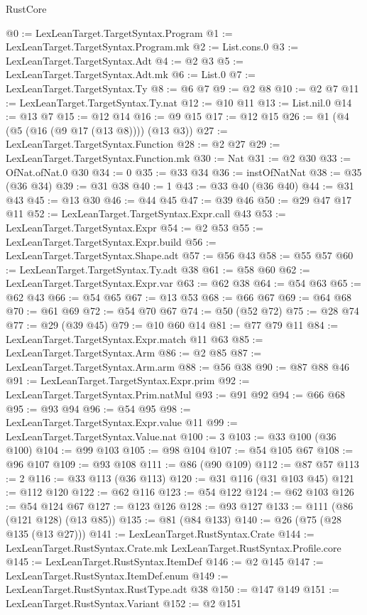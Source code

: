\begin{lexlean}{RustCore}
\begin{coremodule}
@0 := LexLeanTarget.TargetSyntax.Program
@1 := LexLeanTarget.TargetSyntax.Program.mk
@2 := List.cons.{0}
@3 := LexLeanTarget.TargetSyntax.Adt
@4 := @2 @3
@5 := LexLeanTarget.TargetSyntax.Adt.mk
@6 := List.{0}
@7 := LexLeanTarget.TargetSyntax.Ty
@8 := @6 @7
@9 := @2 @8
@10 := @2 @7
@11 := LexLeanTarget.TargetSyntax.Ty.nat
@12 := @10 @11
@13 := List.nil.{0}
@14 := @13 @7
@15 := @12 @14
@16 := @9 @15
@17 := @12 @15
@26 := @1 (@4 (@5 (@16 (@9 @17 (@13 @8)))) (@13 @3))
@27 := LexLeanTarget.TargetSyntax.Function
@28 := @2 @27
@29 := LexLeanTarget.TargetSyntax.Function.mk
@30 := Nat
@31 := @2 @30
@33 := OfNat.ofNat.{0} @30
@34 := 0
@35 := @33 @34
@36 := instOfNatNat
@38 := @35 (@36 @34)
@39 := @31 @38
@40 := 1
@43 := @33 @40 (@36 @40)
@44 := @31 @43
@45 := @13 @30
@46 := @44 @45
@47 := @39 @46
@50 := @29 @47 @17 @11
@52 := LexLeanTarget.TargetSyntax.Expr.call @43
@53 := LexLeanTarget.TargetSyntax.Expr
@54 := @2 @53
@55 := LexLeanTarget.TargetSyntax.Expr.build
@56 := LexLeanTarget.TargetSyntax.Shape.adt
@57 := @56 @43
@58 := @55 @57
@60 := LexLeanTarget.TargetSyntax.Ty.adt @38
@61 := @58 @60
@62 := LexLeanTarget.TargetSyntax.Expr.var
@63 := @62 @38
@64 := @54 @63
@65 := @62 @43
@66 := @54 @65
@67 := @13 @53
@68 := @66 @67
@69 := @64 @68
@70 := @61 @69
@72 := @54 @70 @67
@74 := @50 (@52 @72)
@75 := @28 @74
@77 := @29 (@39 @45)
@79 := @10 @60 @14
@81 := @77 @79 @11
@84 := LexLeanTarget.TargetSyntax.Expr.match @11 @63
@85 := LexLeanTarget.TargetSyntax.Arm
@86 := @2 @85
@87 := LexLeanTarget.TargetSyntax.Arm.arm
@88 := @56 @38
@90 := @87 @88 @46
@91 := LexLeanTarget.TargetSyntax.Expr.prim
@92 := LexLeanTarget.TargetSyntax.Prim.natMul
@93 := @91 @92
@94 := @66 @68
@95 := @93 @94
@96 := @54 @95
@98 := LexLeanTarget.TargetSyntax.Expr.value @11
@99 := LexLeanTarget.TargetSyntax.Value.nat
@100 := 3
@103 := @33 @100 (@36 @100)
@104 := @99 @103
@105 := @98 @104
@107 := @54 @105 @67
@108 := @96 @107
@109 := @93 @108
@111 := @86 (@90 @109)
@112 := @87 @57
@113 := 2
@116 := @33 @113 (@36 @113)
@120 := @31 @116 (@31 @103 @45)
@121 := @112 @120
@122 := @62 @116
@123 := @54 @122
@124 := @62 @103
@126 := @54 @124 @67
@127 := @123 @126
@128 := @93 @127
@133 := @111 (@86 (@121 @128) (@13 @85))
@135 := @81 (@84 @133)
@140 := @26 (@75 (@28 @135 (@13 @27)))
@141 := LexLeanTarget.RustSyntax.Crate
@144 := LexLeanTarget.RustSyntax.Crate.mk LexLeanTarget.RustSyntax.Profile.core
@145 := LexLeanTarget.RustSyntax.ItemDef
@146 := @2 @145
@147 := LexLeanTarget.RustSyntax.ItemDef.enum
@149 := LexLeanTarget.RustSyntax.RustType.adt @38
@150 := @147 @149
@151 := LexLeanTarget.RustSyntax.Variant
@152 := @2 @151

\end{coremodule}
\end{lexlean}
